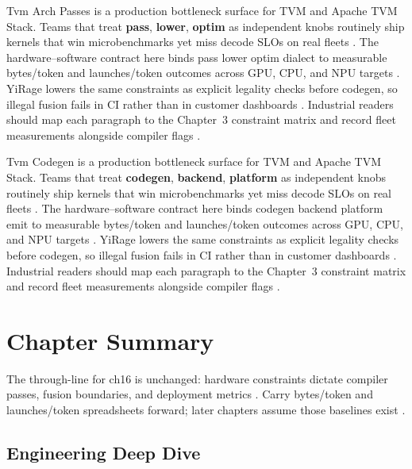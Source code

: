 Tvm Arch Passes is a production bottleneck surface for TVM and Apache TVM Stack. Teams that treat \textbf{pass}, \textbf{lower}, \textbf{optim} as independent knobs routinely ship kernels that win microbenchmarks yet miss decode SLOs on real fleets \citep{nvidia2022hopper,amd2024aie}. The hardware--software contract here binds pass lower optim dialect to measurable bytes/token and launches/token outcomes across GPU, CPU, and NPU targets \citep{semianalysis2024tma,dlbook}. YiRage lowers the same constraints as explicit legality checks before codegen, so illegal fusion fails in CI rather than in customer dashboards \citep{amd2024xdna,dao2022flashattention}. Industrial readers should map each paragraph to the Chapter~3 constraint matrix and record fleet measurements alongside compiler flags \citep{amd2024aie,kwon2023vllm}.

Tvm Codegen is a production bottleneck surface for TVM and Apache TVM Stack. Teams that treat \textbf{codegen}, \textbf{backend}, \textbf{platform} as independent knobs routinely ship kernels that win microbenchmarks yet miss decode SLOs on real fleets \citep{semianalysis2024tma,dlbook}. The hardware--software contract here binds codegen backend platform emit to measurable bytes/token and launches/token outcomes across GPU, CPU, and NPU targets \citep{amd2024xdna,dao2022flashattention}. YiRage lowers the same constraints as explicit legality checks before codegen, so illegal fusion fails in CI rather than in customer dashboards \citep{amd2024aie,kwon2023vllm}. Industrial readers should map each paragraph to the Chapter~3 constraint matrix and record fleet measurements alongside compiler flags \citep{dlbook,nvidia2024cudagraphs}.

\section{Chapter Summary}
\label{sec:ch16_summary}

The through-line for ch16 is unchanged: hardware constraints dictate compiler passes, fusion boundaries, and deployment metrics \citep{memoryfloor2026,amd2024xdna}. Carry bytes/token and launches/token spreadsheets forward; later chapters assume those baselines exist \citep{semianalysis2024tma,dlbook}.


\subsection{Engineering Deep Dive}
\label{sec:ch16_deep_dive}

